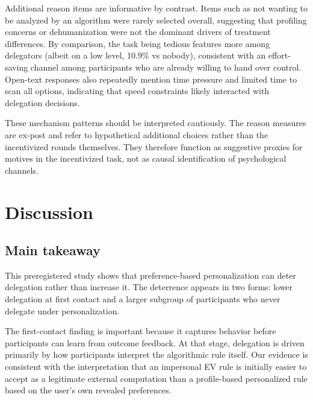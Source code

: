 \documentclass[a4paper, 12pt, fleqn]{article}
\theoremstyle{definition}
\begin{document}
Additional reason items are informative by contrast. Items such as not wanting to be analyzed by an algorithm were rarely selected overall, suggesting that profiling concerns or dehumanization were not the dominant drivers of treatment differences. By comparison, the task being tedious features more among delegators (albeit on a low level, 10.9\% vs nobody), consistent with an effort-saving channel among participants who are already willing to hand over control. Open-text responses also repeatedly mention time pressure and limited time to scan all options, indicating that speed constraints likely interacted with delegation decisions.

These mechanism patterns should be interpreted cautiously. The reason measures are ex-post and refer to hypothetical additional choices rather than the incentivized rounds themselves. They therefore function as suggestive proxies for motives in the incentivized task, not as causal identification of psychological channels.







\section{Discussion}
\label{sec:discussion}

\subsection{Main takeaway}
This preregistered study shows that preference-based personalization can deter delegation rather than increase it. The deterrence appears in two forms: lower delegation at first contact and a larger subgroup of participants who never delegate under personalization.

The first-contact finding is important because it captures behavior before participants can learn from outcome feedback. At that stage, delegation is driven primarily by how participants interpret the algorithmic rule itself. Our evidence is consistent with the interpretation that an impersonal EV rule is initially easier to accept as a legitimate external computation than a profile-based personalized rule based on the user's own revealed preferences.
\end{document}
